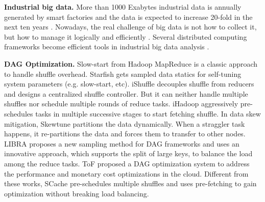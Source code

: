 {\textbf{Industrial big data.}
More than 1000 Exabytes industrial data is annually generated by smart factories and the data is expected to increase 20-fold in the next ten years \cite{yin2015big}.
Nowadays, the real challenge of big data is not how to collect it, but how to manage it logically and efficiently \cite{lv2017next}.
Several distributed computing frameworks become efficient tools in industrial big data analysis \cite{lade2017manufacturing, li2016scientific}.
}

{\color{blue}
\textbf{DAG Optimization.} 
Slow-start from Hadoop MapReduce is a classic approach to handle shuffle overhead. 
Starfish \cite{starfish} gets sampled data statics for self-tuning system parameters (e.g. slow-start, etc). 
iShuffle \cite{guo2017ishuffle} decouples shuffle from reducers and designs a centralized shuffle controller. 
But it can neither handle multiple shuffles nor schedule multiple rounds of reduce tasks. 
iHadoop \cite{ihadoop} aggressively pre-schedules tasks in multiple successive stages to start fetching shuffle. 
In data skew mitigation, 
Skewtune \cite{skewtune} partitions the data dynamically. When a straggler task happens, it re-partitions the data and forces them to transfer to other nodes.
LIBRA \cite{chen2014libra} proposes a new sampling method for DAG frameworks and uses an innovative approach, which supports the split of large keys, to balance the load among the reduce tasks.
ToF \cite{zhou2014transformation} proposed a DAG optimization system to address the performance and monetary cost optimizations in the cloud.
Different from these works, SCache pre-schedules multiple shuffles and uses pre-fetching to gain optimization without breaking load balancing. 
}
